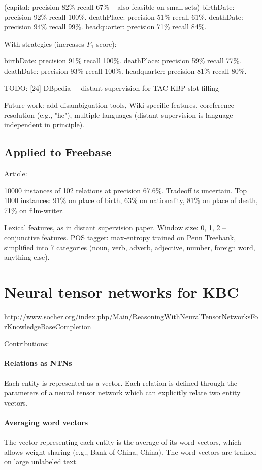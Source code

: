 (capital: precision 82\% recall 67\% -- also feasible on small sets)
birthDate: precision 92\% recall 100\%.
deathPlace: precision 51\% recall 61\%.
deathDate: precision 94\% recall 99\%.
headquarter: precision 71\% recall 84\%.

With strategies (increases $F_1$ score):

birthDate: precision 91\% recall 100\%.
deathPlace: precision 59\% recall 77\%.
deathDate: precision 93\% recall 100\%.
headquarter: precision 81\% recall 80\%.

TODO: [24] DBpedia + distant supervision for TAC-KBP slot-filling

Future work: add disambiguation tools, Wiki-specific features, coreference
resolution (e.g., "he"), multiple languages (distant supervision is
language-independent in principle).

\subsection{Applied to Freebase}

Article: \cite{distant-supervision}

10000 instances of 102 relations at precision 67.6\%. Tradeoff is uncertain.
Top 1000 instances: 91\% on place of birth, 63\% on nationality, 81\% on place
of death, 71\% on film-writer.

Lexical features, as in distant supervision paper. Window size: 0, 1, 2 --
conjunctive features. POS tagger: max-entropy trained on Penn Treebank,
simplified into 7 categories (noun, verb, adverb, adjective, number, foreign
word, anything else).

\section{Neural tensor networks for KBC}
\label{neural-tensor-networks-for-kbc}

http://www.socher.org/index.php/Main/ReasoningWithNeuralTensorNetworksForKnowledgeBaseCompletion

Contributions:

\paragraph{Relations as NTNs}
Each entity is represented as a vector. Each relation is defined through the
parameters of a neural tensor network which can explicitly relate two entity
vectors.

\paragraph{Averaging word vectors}
The vector representing each entity is the average of its word vectors, which
allows weight sharing (e.g., Bank of China, China).
The word vectors are trained on large unlabeled text.

